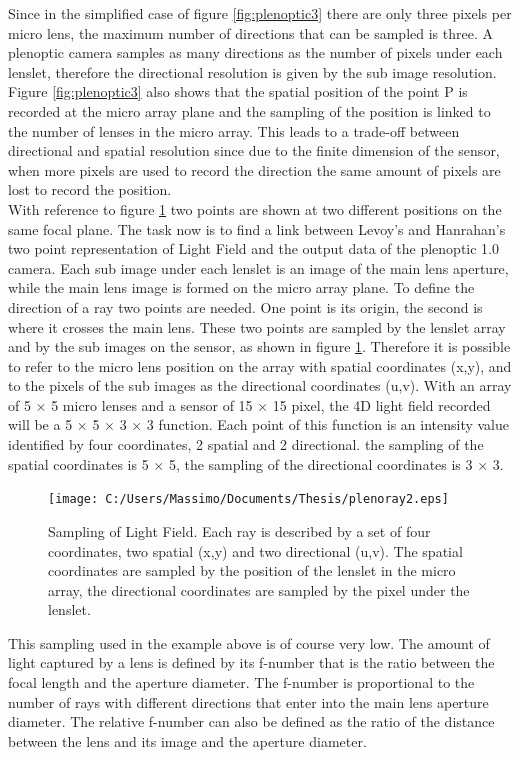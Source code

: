 Since in the simplified case of figure \ref{fig:plenoptic3} there are only three pixels per micro lens, the maximum number of directions that can be sampled is three. A plenoptic camera samples as many directions as the number of pixels under each lenslet, therefore the directional resolution is given by the sub image resolution. Figure \ref{fig:plenoptic3} also shows that the spatial position of the point P is recorded at the micro array plane and the sampling of the position is linked to the number of lenses in the micro array. This leads to a trade-off between directional and spatial resolution since due to the finite dimension of the sensor, when more pixels are used to record the direction the same amount of pixels are lost to record the position. \\
With reference to figure \ref{fig:plenoptic4} two points are shown at two different positions on the same focal plane. The task now is to find a link between Levoy's and Hanrahan's two point representation of Light Field \cite{levoy1996light,levoy2006microscope} and the output data of the plenoptic 1.0 camera. Each sub image under each lenslet is an image of the main lens aperture, while the main lens image is formed on the micro array plane. To define the direction of a ray two points are needed. One point is its origin, the second is where it crosses the main lens. These two points are sampled by the lenslet array and by the sub images on the sensor, as shown in figure \ref{fig:plenoptic4}. Therefore it is possible to refer to the micro lens position on the array with spatial coordinates (x,y), and to the pixels of the sub images as the directional coordinates (u,v). With an array of 5 $\times$ 5 micro lenses and a sensor of 15 $\times$ 15 pixel, the 4D light field recorded will be a 5 $\times$ 5 $\times$ 3 $\times$ 3 function. Each point of this function is an intensity value identified by four coordinates, 2 spatial and 2 directional. the sampling of the spatial coordinates is 5 $\times$ 5, the sampling of the directional coordinates is 3 $\times$ 3. 
\begin{figure}[H]
	\centering
	\texttt{[image: C:/Users/Massimo/Documents/Thesis/plenoray2.eps]}
	\caption{\label{fig:plenoptic4} Sampling of Light Field. Each ray is described by a set of four coordinates, two spatial (x,y) and two directional (u,v). The spatial coordinates are sampled by the position of the lenslet in the micro array, the directional coordinates are sampled by the pixel under the lenslet.}
\end{figure}
This sampling used in the example above is of course very low. The amount of light captured by a lens is defined by its f-number that is the ratio between the focal length and the aperture diameter. The f-number is proportional to the number of rays with different directions that enter into the main lens aperture diameter. The relative f-number can also be defined as the ratio of the distance between the lens and its image and the aperture diameter. 
